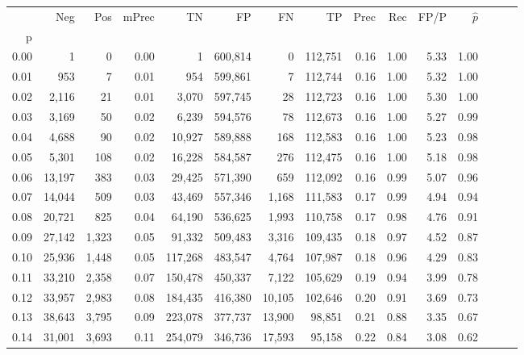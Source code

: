\begin{tabular}{rrrrrrrrrrrrrrr}
\toprule
{} &     Neg &    Pos & mPrec &       TN &       FP &       FN &       TP &  Prec &   Rec &  FP/P & $\hat{p}$ \\
p    &         &        &       &          &          &          &          &       &       &       &           \\
\midrule
0.00 &       1 &      0 &  0.00 &        1 &  600,814 &        0 &  112,751 &  0.16 &  1.00 &  5.33 &      1.00 \\
0.01 &     953 &      7 &  0.01 &      954 &  599,861 &        7 &  112,744 &  0.16 &  1.00 &  5.32 &      1.00 \\
0.02 &   2,116 &     21 &  0.01 &    3,070 &  597,745 &       28 &  112,723 &  0.16 &  1.00 &  5.30 &      1.00 \\
0.03 &   3,169 &     50 &  0.02 &    6,239 &  594,576 &       78 &  112,673 &  0.16 &  1.00 &  5.27 &      0.99 \\
0.04 &   4,688 &     90 &  0.02 &   10,927 &  589,888 &      168 &  112,583 &  0.16 &  1.00 &  5.23 &      0.98 \\
0.05 &   5,301 &    108 &  0.02 &   16,228 &  584,587 &      276 &  112,475 &  0.16 &  1.00 &  5.18 &      0.98 \\
0.06 &  13,197 &    383 &  0.03 &   29,425 &  571,390 &      659 &  112,092 &  0.16 &  0.99 &  5.07 &      0.96 \\
0.07 &  14,044 &    509 &  0.03 &   43,469 &  557,346 &    1,168 &  111,583 &  0.17 &  0.99 &  4.94 &      0.94 \\
0.08 &  20,721 &    825 &  0.04 &   64,190 &  536,625 &    1,993 &  110,758 &  0.17 &  0.98 &  4.76 &      0.91 \\
0.09 &  27,142 &  1,323 &  0.05 &   91,332 &  509,483 &    3,316 &  109,435 &  0.18 &  0.97 &  4.52 &      0.87 \\
0.10 &  25,936 &  1,448 &  0.05 &  117,268 &  483,547 &    4,764 &  107,987 &  0.18 &  0.96 &  4.29 &      0.83 \\
0.11 &  33,210 &  2,358 &  0.07 &  150,478 &  450,337 &    7,122 &  105,629 &  0.19 &  0.94 &  3.99 &      0.78 \\
0.12 &  33,957 &  2,983 &  0.08 &  184,435 &  416,380 &   10,105 &  102,646 &  0.20 &  0.91 &  3.69 &      0.73 \\
0.13 &  38,643 &  3,795 &  0.09 &  223,078 &  377,737 &   13,900 &   98,851 &  0.21 &  0.88 &  3.35 &      0.67 \\
0.14 &  31,001 &  3,693 &  0.11 &  254,079 &  346,736 &   17,593 &   95,158 &  0.22 &  0.84 &  3.08 &      0.62 \\

\end{tabular}
